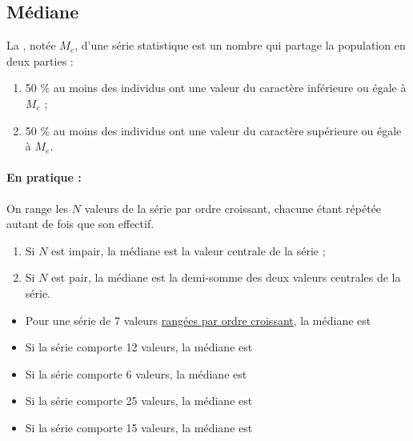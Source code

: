 \bigskip



\subsection{Médiane}

\begin{definition}
    La , notée $M_e$, d'une série statistique est un
  nombre qui partage la population en deux parties :
  \begin{enumerate}
  \item 50 \% au moins des individus ont une valeur du caractère
    inférieure ou égale à $M_e$ ;
  \item 50 \% au moins des individus ont une valeur du caractère
    supérieure ou égale à $M_e$.
  \end{enumerate}  

    
\end{definition}

\bigskip

\paragraph{En pratique :}On range les $N$ valeurs de la série par ordre
  croissant, chacune étant répétée autant de fois que son effectif.


\begin{enumerate}
\item Si $N$ est impair, la médiane est la valeur centrale de la série ;
\item Si $N$ est pair, la médiane est la demi-somme des deux valeurs
  centrales de la série.
\end{enumerate}

\medskip

\begin{example}
\begin{itemize}
\item Pour une série de 7 valeurs \underline{rangées par ordre
    croissant}, la médiane est \comp \comp \\[-4ex]
\item Si la série comporte 12 valeurs, la médiane est \comp \comp
  \comp \\[-1ex]
\item Si la série comporte 6 valeurs, la médiane est \comp \comp
  \comp \\[-1ex]
\item Si la série comporte 25 valeurs, la médiane est \comp \comp
  \comp \\[-1ex]
\item Si la série comporte 15 valeurs, la médiane est \comp \comp \comp
\end{itemize}

    
\end{example}


